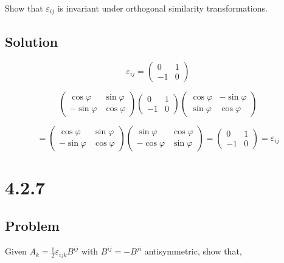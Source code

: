 \documentclass[12pt]{article}
\begin{document}
Show that \(\varepsilon_{ij}\) is invariant under orthogonal similarity transformations.

\subsection{Solution}

\[
    \varepsilon_{ij} = \begin{pmatrix}
        0  & 1 \\
        -1 & 0
    \end{pmatrix}
\]

\[
    \begin{pmatrix}
        \cos \varphi  & \sin \varphi \\
        -\sin \varphi & \cos \varphi
    \end{pmatrix}
    \begin{pmatrix}
        0  & 1 \\
        -1 & 0
    \end{pmatrix}
    \begin{pmatrix}
        \cos \varphi & -\sin \varphi \\
        \sin \varphi & \cos \varphi
    \end{pmatrix}
\]

\[
    =
    \begin{pmatrix}
        \cos \varphi  & \sin \varphi \\
        -\sin \varphi & \cos \varphi
    \end{pmatrix}
    \begin{pmatrix}
        \sin \varphi  & \cos \varphi \\
        -\cos \varphi & \sin \varphi
    \end{pmatrix}
    =
    \begin{pmatrix}
        0  & 1 \\
        -1 & 0
    \end{pmatrix}
    = \varepsilon_{ij}
\]

\newpage
\section{4.2.7}

\subsection{Problem}

Given \(A_k = \frac{1}{2}\varepsilon_{ijk}B^{ij}\) with \(B^{ij} = -B^{ji}\) antisymmetric, show that,
\end{document}
